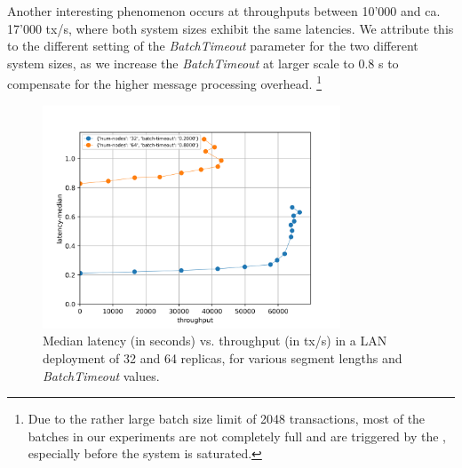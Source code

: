 \documentclass{article}
\begin{document}
Another interesting phenomenon occurs at throughputs between 10'000 and ca. 17'000 tx/s, where both system sizes exhibit the same latencies.
We attribute this to the different setting of the \textit{BatchTimeout} parameter for the two different system sizes,
as we increase the \textit{BatchTimeout} at larger scale to 0.8 s to compensate for the higher message processing overhead.%
\footnote{Due to the rather large batch size limit of 2048 transactions,
most of the batches in our experiments are not completely full and are triggered by the , especially before the system is saturated.}

\begin{figure}
    \centering
    \includegraphics[width=0.79\textwidth]{figures/results-lan-final.png}
    \caption{\centering Median latency (in seconds) vs. throughput (in tx/s)
    in a LAN deployment of 32 and 64 replicas,
    for various segment lengths and \textit{BatchTimeout} values.}
    \label{fig:eval-lan}
\end{figure}

\end{document}
